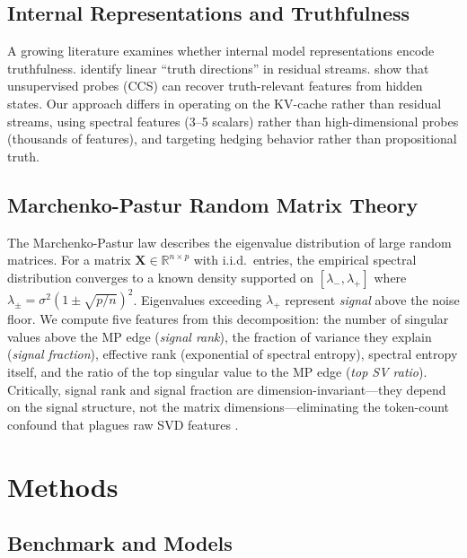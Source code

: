 \documentclass[11pt,a4paper]{article}
\begin{document}
\subsection{Internal Representations and Truthfulness}

A growing literature examines whether internal model representations encode truthfulness. \citet{marks2024geometry} identify linear ``truth directions'' in residual streams. \citet{burns2023discovering} show that unsupervised probes (CCS) can recover truth-relevant features from hidden states. Our approach differs in operating on the KV-cache rather than residual streams, using spectral features (3--5 scalars) rather than high-dimensional probes (thousands of features), and targeting hedging behavior rather than propositional truth.

\subsection{Marchenko-Pastur Random Matrix Theory}

The Marchenko-Pastur law \citep{marchenko1967distribution} describes the eigenvalue distribution of large random matrices. For a matrix $\mathbf{X} \in \mathbb{R}^{n \times p}$ with i.i.d.\ entries, the empirical spectral distribution converges to a known density supported on $[\lambda_-, \lambda_+]$ where $\lambda_\pm = \sigma^2(1 \pm \sqrt{p/n})^2$. Eigenvalues exceeding $\lambda_+$ represent \emph{signal} above the noise floor. We compute five features from this decomposition: the number of singular values above the MP edge (\emph{signal rank}), the fraction of variance they explain (\emph{signal fraction}), effective rank (exponential of spectral entropy), spectral entropy itself, and the ratio of the top singular value to the MP edge (\emph{top SV ratio}). Critically, signal rank and signal fraction are dimension-invariant---they depend on the signal structure, not the matrix dimensions---eliminating the token-count confound that plagues raw SVD features \citep{edrington2026detecting}.

\section{Methods}
\label{sec:methods}

\subsection{Benchmark and Models}
\end{document}
